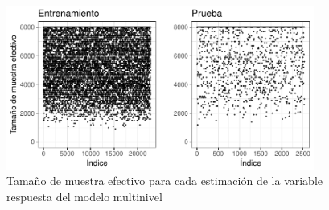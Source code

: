 \begin{figure}[H]
    \centering
    \includegraphics[width=0.9\textwidth]{images/three_levels_n_eff_yf.pdf}
    \caption{Tamaño de muestra efectivo para cada estimación de la variable respuesta del modelo multinivel}
    \label{fig:three_levels_n_eff_yf}
\end{figure}